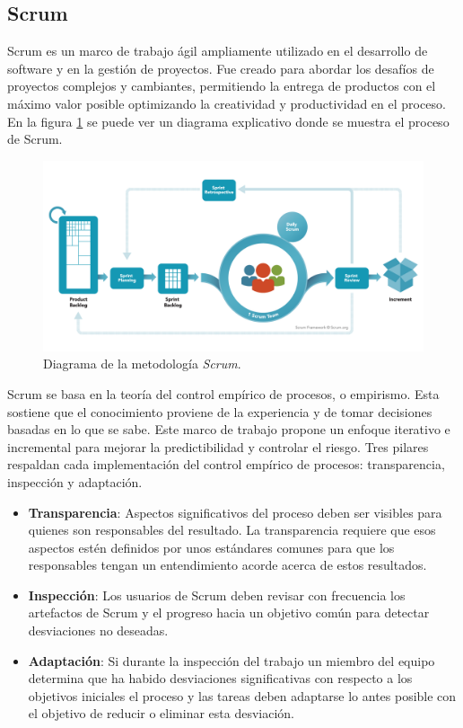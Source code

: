 \subsection{Scrum}
Scrum es un marco de trabajo ágil ampliamente utilizado en el desarrollo de software y en la gestión de proyectos. Fue creado para abordar los desafíos de proyectos complejos y cambiantes, permitiendo la entrega de productos con el máximo valor posible optimizando la creatividad y productividad en el proceso. En la figura \ref{fig:scrum} se puede ver un diagrama explicativo donde se muestra el proceso de Scrum.\\
\noindent\begin{figure}[hp!]
  \centering
    \includegraphics[width=\textwidth]{imaxes/scrum.png}
  \caption{Diagrama de la metodología \textit{Scrum}.}
  \label{fig:scrum}
\end{figure}
Scrum se basa en la teoría del control empírico de procesos, o empirismo. Esta sostiene que el conocimiento proviene de la experiencia y de tomar decisiones basadas en lo que se sabe. Este marco de trabajo propone un enfoque iterativo e incremental para mejorar la predictibilidad y controlar el riesgo. Tres pilares respaldan cada implementación del control empírico de procesos: transparencia, inspección y adaptación.
\begin{itemize}
    \item \textbf{Transparencia}: Aspectos significativos del proceso deben ser visibles para quienes son responsables del resultado. La transparencia requiere que esos aspectos estén definidos por unos estándares comunes para que los responsables tengan un entendimiento acorde acerca de estos resultados.
    \item \textbf{Inspección}: Los usuarios de Scrum deben revisar con frecuencia los artefactos de Scrum y el progreso hacia un objetivo común para detectar desviaciones no deseadas.
    \item \textbf{Adaptación}: Si durante la inspección del trabajo un miembro del equipo determina que ha habido desviaciones significativas con respecto a los objetivos iniciales el proceso y las tareas deben adaptarse lo antes posible con el objetivo de reducir o eliminar esta desviación.
\end{itemize}
